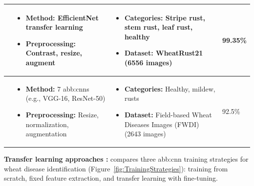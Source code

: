 \begin{longtable}{|p{3cm}|p{6cm}|p{3.5cm}|p{2.5cm}|}
\parencite{nigam2023deep} &
\begin{itemize}
    \item \textbf{Method:} EfficientNet transfer learning
    \item \textbf{Preprocessing:} Contrast, resize, augment
\end{itemize} &
\begin{itemize}
    \item \textbf{Categories:} Stripe rust, stem rust, leaf rust, healthy
    \item \textbf{Dataset:} WheatRust21 (6556 images)
\end{itemize} &
99.35\% \\
\hline

\parencite{jiang2022evaluation} &
\begin{itemize}
    \item \textbf{Method:} 7 \gls{abb:cnn}s (e.g., VGG-16, ResNet-50)
    \item \textbf{Preprocessing:} Resize, normalization, augmentation
\end{itemize} &
\begin{itemize}
    \item \textbf{Categories:} Healthy, mildew, rusts
    \item \textbf{Dataset:} Field-based Wheat Diseases Images (FWDI) (2643 images)
\end{itemize} &
92.5\% \\
\hline

\end{longtable}



\textbf{Transfer learning approaches \parencite{jiang2022evaluation}:}  compares three \gls{abb:cnn} training strategies for wheat disease identification (Figure~\ref{fig:TrainingStrategies}): training from scratch, fixed feature extraction, and transfer learning with fine-tuning.

